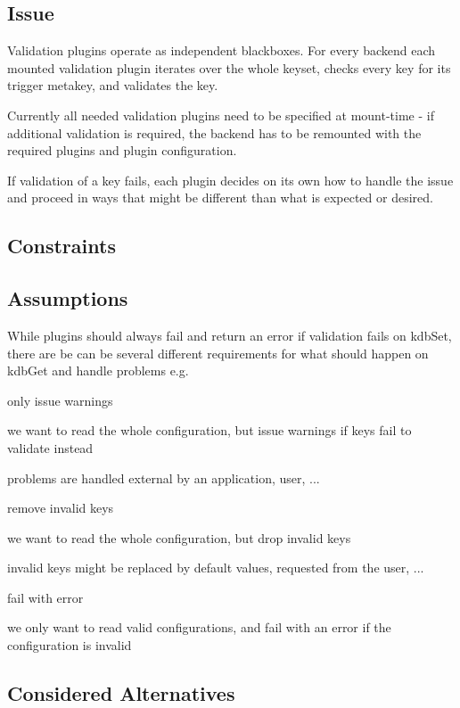 \subsection*{Issue}

Validation plugins operate as independent blackboxes. For every backend each mounted validation plugin iterates over the whole keyset, checks every key for its trigger metakey, and validates the key.

Currently all needed validation plugins need to be specified at mount-\/time -\/ if additional validation is required, the backend has to be remounted with the required plugins and plugin configuration.

If validation of a key fails, each plugin decides on its own how to handle the issue and proceed in ways that might be different than what is expected or desired.

\subsection*{Constraints}

\subsection*{Assumptions}

While plugins should always fail and return an error if validation fails on kdb\+Set, there are be can be several different requirements for what should happen on kdb\+Get and handle problems e.\+g.


\begin{DoxyItemize}
\item only issue warnings

we want to read the whole configuration, but issue warnings if keys fail to validate instead

problems are handled external by an application, user, ...
\item remove invalid keys

we want to read the whole configuration, but drop invalid keys

invalid keys might be replaced by default values, requested from the user, ...
\item fail with error

we only want to read valid configurations, and fail with an error if the configuration is invalid
\end{DoxyItemize}

\subsection*{Considered Alternatives}


